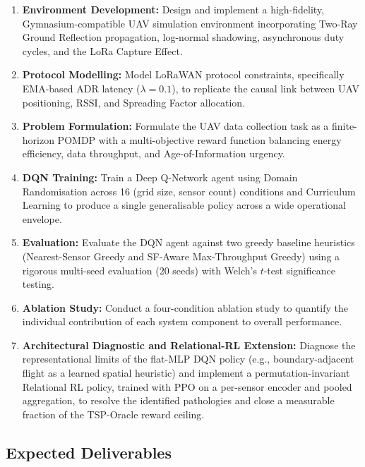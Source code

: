 \begin{enumerate}
    \item \textbf{Environment Development:} Design and implement a high-fidelity, Gymnasium-compatible UAV simulation environment incorporating Two-Ray Ground Reflection propagation, log-normal shadowing, asynchronous duty cycles, and the LoRa Capture Effect.
    \item \textbf{Protocol Modelling:} Model LoRaWAN protocol constraints, specifically EMA-based ADR latency ($\lambda = 0.1$), to replicate the causal link between UAV positioning, RSSI, and Spreading Factor allocation.
    \item \textbf{Problem Formulation:} Formulate the UAV data collection task as a finite-horizon POMDP with a multi-objective reward function balancing energy efficiency, data throughput, and Age-of-Information urgency.
    \item \textbf{DQN Training:} Train a Deep Q-Network agent using Domain Randomisation across 16 (grid size, sensor count) conditions and Curriculum Learning to produce a single generalisable policy across a wide operational envelope.
    \item \textbf{Evaluation:} Evaluate the DQN agent against two greedy baseline heuristics (Nearest-Sensor Greedy and SF-Aware Max-Throughput Greedy) using a rigorous multi-seed evaluation (20 seeds) with Welch's $t$-test significance testing.
    \item \textbf{Ablation Study:} Conduct a four-condition ablation study to quantify the individual contribution of each system component to overall performance.
    \item \textbf{Architectural Diagnostic and Relational-RL Extension:} Diagnose the representational limits of the flat-MLP DQN policy (e.g., boundary-adjacent flight as a learned spatial heuristic) and implement a permutation-invariant Relational RL policy, trained with PPO on a per-sensor encoder and pooled aggregation, to resolve the identified pathologies and close a measurable fraction of the TSP-Oracle reward ceiling.
\end{enumerate}

\subsection*{Expected Deliverables}

